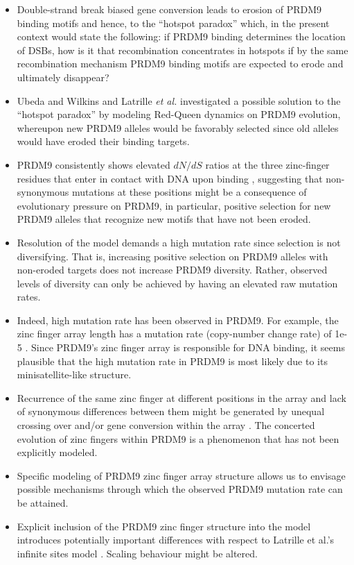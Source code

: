 \documentclass[a4paper,10pt]{article}
\begin{document}
\begin{itemize}
 \item Double-strand break biased gene conversion leads to erosion of PRDM9 binding motifs and hence, to the ``hotspot paradox'' which, in the present context would state the following: if PRDM9 binding determines the location of DSBs, how is it that recombination concentrates in hotspots if by the same recombination mechanism PRDM9 binding motifs are expected to erode and ultimately disappear? 
 \item Ubeda and Wilkins \cite{Ubeda2011} and Latrille \textit{et al.} \cite{Latrille2017} investigated a possible solution to the ``hotspot paradox'' by modeling Red-Queen dynamics on PRDM9 evolution, whereupon new PRDM9 alleles would be favorably selected since old alleles would have eroded their binding targets.
 \item PRDM9 consistently shows elevated $dN/dS$ ratios \cite{Oliver2009, Thomas2009, Groeneveld2012, Schwartz2014} at the three zinc-finger residues that enter in contact with DNA upon binding \cite{Wolfe2000b}, suggesting that non-synonymous mutations at these positions might be a consequence of evolutionary pressure on PRDM9, in particular, positive selection for new PRDM9 alleles that recognize new motifs that have not been eroded. 
 \item Resolution of the model demands a high mutation rate since selection is not diversifying. That is, increasing positive selection on PRDM9 alleles with non-eroded targets does not increase PRDM9 diversity. Rather, observed levels of diversity can only be achieved by having an elevated raw mutation rates. 
 \item Indeed, high mutation rate has been observed in PRDM9. For example, the zinc finger array length has a mutation rate (copy-number change rate) of 1e-5 \cite{Jeffreys2013}. Since PRDM9's zinc finger array is responsible for DNA binding, it seems plausible that the high mutation rate in PRDM9 is most likely due to its minisatellite-like structure. 
 \item Recurrence of the same zinc finger at different positions in the array and lack of synonymous differences between them \cite{Oliver2009, Thomas2009} might be generated by unequal crossing over and/or gene conversion within the array \cite{Grey2018}. The concerted evolution of zinc fingers within PRDM9 is a phenomenon that has not been explicitly modeled. 
 \item Specific modeling of PRDM9 zinc finger array structure allows us to envisage possible mechanisms through which the observed PRDM9 mutation rate can be attained. 
 \item Explicit inclusion of the PRDM9 zinc finger structure into the model introduces potentially important differences with respect to Latrille et al.'s infinite sites model \cite{Latrille2017}. Scaling behaviour might be altered. 
\end{itemize}
\end{document}
